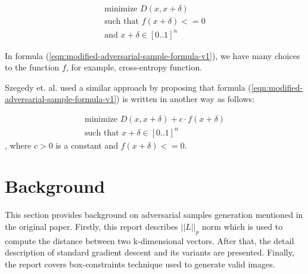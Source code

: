 \documentclass[12pt]{article}
\begin{document}
\begin{equation}
\begin{split}
\label{eqn:modified-adversarial-sample-formula-v1}
\text{minimize } D(x, x + \delta)
\\
\text{such that } f(x+\delta) <= 0 
\\
\text{and } x + \delta \in [0..1]^n
\end{split}
\end{equation}

In formula (\ref{eqn:modified-adversarial-sample-formula-v1}), we have many choices to the function $f$, for example, cross-entropy function.

Szegedy et. al.  used a similar approach by proposing that formula (\ref{eqn:modified-adversarial-sample-formula-v1}) is written in another way as follows:

\begin{equation}
\begin{split}
\label{eqn:modified-adversarial-sample-formula-v2}
\text{minimize } D(x, x + \delta) + c \cdot f(x+\delta)
\\
\text{such that } x + \delta \in [0..1]^n
\end{split}
\end{equation}
, where $c > 0$ is a constant and $f(x+\delta) <= 0$.

\section{Background}

This section provides background on adversarial samples generation mentioned in the original paper. Firstly, this report describes $||L||_p$ norm which is used to compute the distance between two k-dimensional vectors. After that, the detail description of standard gradient descent and its variants are presented. Finally, the report covers box-constraints technique used to generate valid images.
\end{document}
